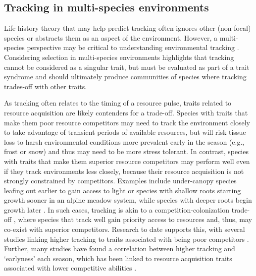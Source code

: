 \documentclass[11pt,letterpaper]{article}
\newcommand{\R}[1]{\label{#1}\linelabel{#1}}
\begin{document}
\subsection{Tracking in multi-species environments} 
Life history theory that may help predict tracking often ignores other (non-focal) species or abstracts them as an aspect of the environment. However, a multi-species perspective may be critical to understanding environmental tracking \citep{metcalf2015}. Considering selection in multi-species environments highlights that tracking cannot be considered as a singular trait, but must be evaluated as part of a trait syndrome \citep[or mosaic of traits,][]{Ghalambor2007} and should ultimately produce communities of species where tracking trades-off with other traits. 

As tracking often relates to the timing of a resource pulse, traits related to resource acquisition are likely contenders for a trade-off. Species with traits that make them poor resource competitors may need to track the environment closely to take advantage of transient periods of available resources, but will risk tissue loss to harsh environmental conditions more prevalent early in the season (e.g., frost or snow) and thus may need to be more stress tolerant.\R{r1stress} In contrast, species with traits that make them superior resource competitors may perform well even if they track environments less closely, because their resource acquisition is not strongly constrained by competitors. Examples include under-canopy species leafing out earlier to gain access to light \citep{heberling2019} or species with shallow roots starting growth sooner in an alpine meadow system, while species with deeper roots begin growth later \citep{Zhu2016BioLetters}. In such cases, tracking is akin to a competition-colonization trade-off \citep{Amarasekare:2003tq}, where species that track well gain priority access to resources and, thus, may co-exist with superior competitors. Research to date supports this, with several studies linking higher tracking to traits associated with being poor competitors \citep{Dorji2013,lasky2016,Zhu2016BioLetters}. Further, many studies have found a correlation between higher tracking and `earlyness' each season, which has been linked to resource acquisition traits associated with lower competitive abilities \citep[][see Box `Trait trade-offs with tracking']{wolkovich2014aob}.  
\end{document}
